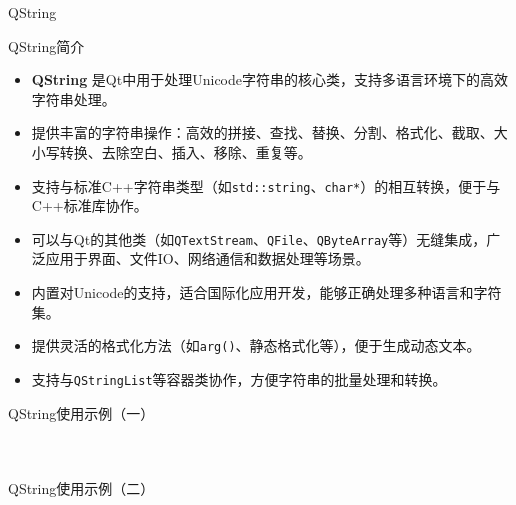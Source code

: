 \documentclass[UTF8,aspectratio=169]{beamer}
\begin{document}
\begin{frame}{QString}
    \begin{ytublock}{QString简介}
        \begin{itemize}
            \item \textbf{QString} 是Qt中用于处理Unicode字符串的核心类，支持多语言环境下的高效字符串处理。
            \item 提供丰富的字符串操作：高效的拼接、查找、替换、分割、格式化、截取、大小写转换、去除空白、插入、移除、重复等。
            \item 支持与标准C++字符串类型（如\texttt{std::string}、\texttt{char*}）的相互转换，便于与C++标准库协作。
            \item 可以与Qt的其他类（如\texttt{QTextStream}、\texttt{QFile}、\texttt{QByteArray}等）无缝集成，广泛应用于界面、文件IO、网络通信和数据处理等场景。
            \item 内置对Unicode的支持，适合国际化应用开发，能够正确处理多种语言和字符集。
            \item 提供灵活的格式化方法（如\texttt{arg()}、静态格式化等），便于生成动态文本。
            \item 支持与\texttt{QStringList}等容器类协作，方便字符串的批量处理和转换。
        \end{itemize}
    \end{ytublock}
\end{frame}

\begin{frame}[fragile]{QString使用示例（一）}
    \begin{columns}
        \begin{column}{0.48\textwidth}
            \inputminted[firstline=1,lastline=16]{cpp}{code/qt_string_example.cpp}
        \end{column}
        \begin{column}{0.48\textwidth}
            \inputminted[firstline=18,lastline=35]{cpp}{code/qt_string_example.cpp}
        \end{column}
    \end{columns}
\end{frame}

\begin{frame}[fragile]{QString使用示例（二）}
    \begin{columns}
        \begin{column}{0.48\textwidth}
            \inputminted[firstline=37,lastline=55]{cpp}{code/qt_string_example.cpp}
        \end{column}
        \begin{column}{0.48\textwidth}
            \inputminted[firstline=57,lastline=70]{cpp}{code/qt_string_example.cpp}
        \end{column}
    \end{columns}
\end{frame}
\end{document}
